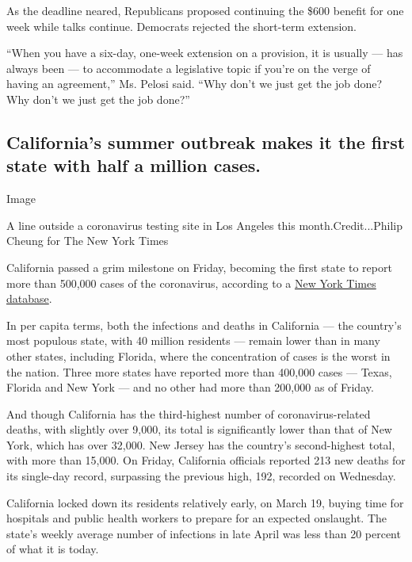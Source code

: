 As the deadline neared, Republicans proposed continuing the \$600
benefit for one week while talks continue. Democrats rejected the
short-term extension.

``When you have a six-day, one-week extension on a provision, it is
usually --- has always been --- to accommodate a legislative topic if
you're on the verge of having an agreement,'' Ms. Pelosi said. ``Why
don't we just get the job done? Why don't we just get the job done?''

\hypertarget{californias-summer-outbreak-makes-it-the-first-state-with-half-a-million-cases}{%
\subsection{California's summer outbreak makes it the first state with
half a million
cases.}\label{californias-summer-outbreak-makes-it-the-first-state-with-half-a-million-cases}}

Image

A line outside a coronavirus testing site in Los Angeles this
month.Credit...Philip Cheung for The New York Times

California passed a grim milestone on Friday, becoming the first state
to report more than 500,000 cases of the coronavirus, according to a
\href{https://www.nytimes3xbfgragh.onion/interactive/2020/us/coronavirus-us-cases.html\#states}{New
York Times database}.

In per capita terms, both the infections and deaths in California ---
the country's most populous state, with 40 million residents --- remain
lower than in many other states, including Florida, where the
concentration of cases is the worst in the nation. Three more states
have reported more than 400,000 cases --- Texas, Florida and New York
--- and no other had more than 200,000 as of Friday.

And though California has the third-highest number of
coronavirus-related deaths, with slightly over 9,000, its total is
significantly lower than that of New York, which has over 32,000. New
Jersey has the country's second-highest total, with more than 15,000. On
Friday, California officials reported 213 new deaths for its single-day
record, surpassing the previous high, 192, recorded on Wednesday.

California locked down its residents relatively early, on March 19,
buying time for hospitals and public health workers to prepare for an
expected onslaught. The state's weekly average number of infections in
late April was less than 20 percent of what it is today.

